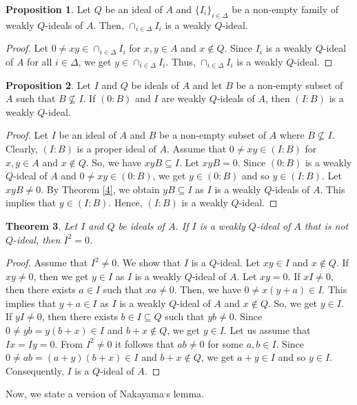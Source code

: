 \documentclass[preprint,review,10pt]{amsart}
\newtheorem{theorem}{Theorem}[section]
\theoremstyle{definition}
\newtheorem{proposition}[theorem]{Proposition}
\theoremstyle{remark}
\numberwithin{equation}{section}
\begin{document}
\begin{proposition}
Let $Q$ be an   ideal of $A$ and $\{I_i\}_{i \in \Delta}$ be a non-empty family of weakly $Q$-ideals of $A$. Then, $\cap_{i \in \Delta}I_i$ is a weakly $Q$-ideal. 
\end{proposition}
\begin{proof}
Let $0 \neq xy \in \cap_{i \in \Delta}I_i$ for $x,y \in A$ and $x \notin Q$. Since $ I_i $ is a  weakly $Q$-ideal of $A$ for all $i \in \Delta$, we get $y \in \cap_{i \in \Delta}I_i$. Thus, $\cap_{i \in \Delta}I_i$ is a weakly $Q$-ideal. 
\end{proof}
\begin{proposition}
Let  $I$ and $Q$ be ideals of $A$ and let $B$ be a non-empty subset of $A$ such that $B \nsubseteq I$. If $(0:B)$  and  $I$ are weakly $Q$-ideals of $A$, then $(I:B)$ is a weakly $Q$-ideal.  
\end{proposition}
\begin{proof}
Let $I$  be an ideal  of $A$ and   $B$ be a non-empty subset of $A$ where $B \nsubseteq I$. Clearly, $(I:B)$ is a proper ideal of $A$. Assume that $0 \neq xy \in (I:B)$ for $x,y \in A$ and $x \notin Q$. So, we have $xyB \subseteq I$. Let  $xyB=0$. Since  $(0:B)$  is a weakly $Q$-ideal  of $A$ and $0 \neq xy \in (0:B)$, we get $y \in (0:B)$ and so $y \in (I:B)$. Let $xyB \neq 0$.    By Theorem \ref{4}, we obtain $yB \subseteq   I$ as $I$ is a  weakly $Q$-ideals of $A$. This implies that $y \in (I:B)$. Hence, $(I:B)$ is a weakly $Q$-ideal.
\end{proof}
\begin{theorem} \label{5}
Let $I$ and $Q$ be  ideals  of $A$.  If $I$ is a weakly $Q$-ideal of $A$ that is not $Q$-ideal, then $I^2=0$.
\end{theorem}
\begin{proof}
Assume that $I^2 \neq 0$. We show that $I$ is a $Q$-ideal. Let $xy \in I$ and $x \notin Q$. If $xy \neq 0$, then we get $y \in I$ as $I$ is a weakly $Q$-ideal of $A$. Let $xy =0$. If $xI \neq 0$, then there exists $a \in I$ such that $xa \neq 0$. Then, we have $0 \neq x(y+a) \in I$. This implies that $y+a \in I$ as $I$ is a weakly $Q$-ideal of $A$ and $x \notin Q$. So, we get $y \in I$. If $yI \neq 0$, then there exists $b \in I \subseteq Q$ such that $yb \neq 0$. Since $0 \neq yb =y(b+x)  \in I$ and  $b+x \notin Q$, we get $y \in I$. Let us assume that $Ix=Iy=0$. From $I^2 \neq 0$ it follows that $ab \neq 0$ for some $a,b \in I$. Since $0 \neq ab=(a+y)(b+x) \in I$ and $b+x \notin Q$, we get $a+y \in I$ and so $y \in I$. Consequently, $I$ is a $Q$-ideal of $A$.
\end{proof}
Now, we state a version of Nakayama$^,$s lemma.
\end{document}
